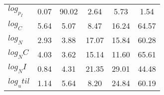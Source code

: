 \begin{center}
\begin{longtable}{lccccc}
$log_p_I   $	 & 	        0.07	 & 	       90.02	 & 	        2.64	 & 	        5.73	 & 	        1.54 \\ 
$log_C     $	 & 	        5.64	 & 	        5.07	 & 	        8.47	 & 	       16.24	 & 	       64.57 \\ 
$log_N     $	 & 	        2.93	 & 	        3.88	 & 	       17.07	 & 	       15.84	 & 	       60.28 \\ 
$log_NC    $	 & 	        4.03	 & 	        3.62	 & 	       15.14	 & 	       11.60	 & 	       65.61 \\ 
$log_NI    $	 & 	        0.84	 & 	        4.31	 & 	       21.35	 & 	       29.01	 & 	       44.48 \\ 
$log_util  $	 & 	        1.14	 & 	        5.64	 & 	        8.20	 & 	       24.84	 & 	       60.19 \\ 
\end{longtable}
 \end{center}
